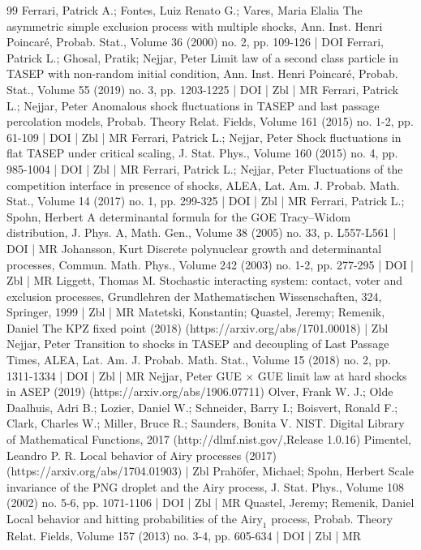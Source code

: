 \documentclass[10pt]{amsart}
\theoremstyle{definition}\newtheorem{defi}[theo]{Definition}\newtheorem{rema}[theo]{Remark}\newtheorem{exam}[theo]{Example}\newtheorem{exem}[theo]{Example}\newtheorem{nota}[theo]{Notation}
\begin{document}
\begin{thebibliography}{99}
Ferrari, Patrick A.; Fontes, Luiz Renato G.; Vares, Maria Elalia The asymmetric simple exclusion process with multiple shocks, Ann. Inst. Henri Poincaré, Probab. Stat., Volume 36 (2000) no. 2, pp. 109-126 | DOI
Ferrari, Patrick L.; Ghosal, Pratik; Nejjar, Peter Limit law of a second class particle in TASEP with non-random initial condition, Ann. Inst. Henri Poincaré, Probab. Stat., Volume 55 (2019) no. 3, pp. 1203-1225 | DOI | Zbl | MR
Ferrari, Patrick L.; Nejjar, Peter Anomalous shock fluctuations in TASEP and last passage percolation models, Probab. Theory Relat. Fields, Volume 161 (2015) no. 1-2, pp. 61-109 | DOI | Zbl | MR
Ferrari, Patrick L.; Nejjar, Peter Shock fluctuations in flat TASEP under critical scaling, J. Stat. Phys., Volume 160 (2015) no. 4, pp. 985-1004 | DOI | Zbl | MR
Ferrari, Patrick L.; Nejjar, Peter Fluctuations of the competition interface in presence of shocks, ALEA, Lat. Am. J. Probab. Math. Stat., Volume 14 (2017) no. 1, pp. 299-325 | DOI | Zbl | MR
Ferrari, Patrick L.; Spohn, Herbert A determinantal formula for the GOE Tracy–Widom distribution, J. Phys. A, Math. Gen., Volume 38 (2005) no. 33, p. L557-L561 | DOI | MR
Johansson, Kurt Discrete polynuclear growth and determinantal processes, Commun. Math. Phys., Volume 242 (2003) no. 1-2, pp. 277-295 | DOI | Zbl | MR
Liggett, Thomas M. Stochastic interacting system: contact, voter and exclusion processes, Grundlehren der Mathematischen Wissenschaften, 324, Springer, 1999 | Zbl | MR
Matetski, Konstantin; Quastel, Jeremy; Remenik, Daniel The KPZ fixed point (2018) (https://arxiv.org/abs/1701.00018) | Zbl
Nejjar, Peter Transition to shocks in TASEP and decoupling of Last Passage Times, ALEA, Lat. Am. J. Probab. Math. Stat., Volume 15 (2018) no. 2, pp. 1311-1334 | DOI | Zbl | MR
Nejjar, Peter GUE $\times $ GUE limit law at hard shocks in ASEP (2019) (https://arxiv.org/abs/1906.07711)
Olver, Frank W. J.; Olde Daalhuis, Adri B.; Lozier, Daniel W.; Schneider, Barry I.; Boisvert, Ronald F.; Clark, Charles W.; Miller, Bruce R.; Saunders, Bonita V. NIST. Digital Library of Mathematical Functions, 2017 (http://dlmf.nist.gov/,Release 1.0.16)
Pimentel, Leandro P. R. Local behavior of Airy processes (2017) (https://arxiv.org/abs/1704.01903) | Zbl
Prahöfer, Michael; Spohn, Herbert Scale invariance of the PNG droplet and the Airy process, J. Stat. Phys., Volume 108 (2002) no. 5-6, pp. 1071-1106 | DOI | Zbl | MR
Quastel, Jeremy; Remenik, Daniel Local behavior and hitting probabilities of the $\text{Airy}_1$ process, Probab. Theory Relat. Fields, Volume 157 (2013) no. 3-4, pp. 605-634 | DOI | Zbl | MR

\end{thebibliography}
\end{document}
